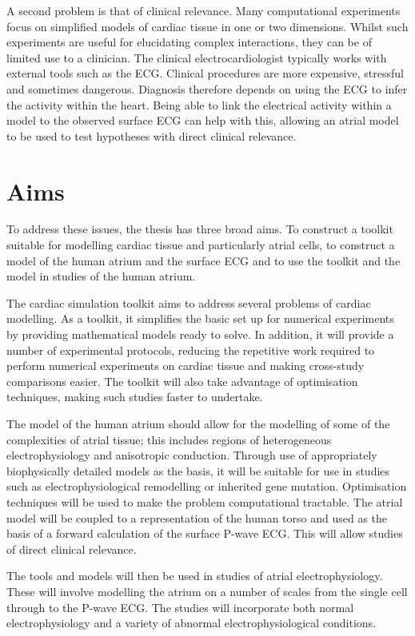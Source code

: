 A second problem is that of clinical relevance.
Many computational experiments focus on simplified models of cardiac tissue in
one or two dimensions.
Whilst such experiments are useful for elucidating complex interactions, they
can be of limited use to a clinician.
The clinical electrocardiologist typically works with external tools such as the
ECG.
Clinical procedures are more expensive, stressful and sometimes dangerous.
Diagnosis therefore depends on using the ECG to infer the activity within the
heart.
Being able to link the electrical activity within a model to the observed
surface ECG can help with this, allowing an atrial model to be used to test
hypotheses with direct clinical relevance.


\section{Aims}

To address these issues, the thesis has three broad aims.
To construct a toolkit suitable for modelling cardiac tissue and particularly
atrial cells, to construct a model of the human atrium and the surface ECG and to
use the toolkit and the model in studies of the human atrium.

The cardiac simulation toolkit aims to address several problems of cardiac
modelling.
As a toolkit, it simplifies the basic set up for numerical experiments by
providing mathematical models ready to solve.
In addition, it will provide a number of experimental protocols, reducing the
repetitive work required to perform numerical experiments on cardiac tissue and
making cross-study comparisons easier.
The toolkit will also take advantage of optimisation techniques, making such
studies faster to undertake.

The model of the human atrium should allow for the modelling of some of the
complexities of atrial tissue; this includes regions of heterogeneous
electrophysiology and anisotropic conduction.
Through use of appropriately biophysically detailed models as the basis, it will
be suitable for use in studies such as electrophysiological remodelling or
inherited gene mutation.
Optimisation techniques will be used to make the problem computational
tractable.
The atrial model will be coupled to a representation of the human torso and used
as the basis of a forward calculation of the surface P-wave ECG.
This will allow studies of direct clinical relevance.


The tools and models will then be used in studies of atrial electrophysiology.
These will involve modelling the atrium on a number of scales from the single
cell through to the P-wave ECG.
The studies will incorporate both normal electrophysiology and a variety of
abnormal electrophysiological conditions.


